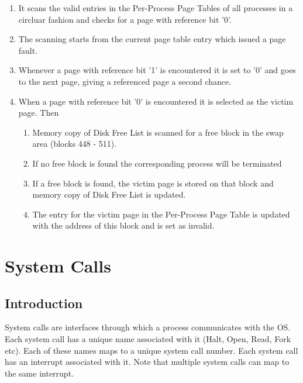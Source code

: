 \documentclass[10pt]{report}
\begin{document}
\begin{enumerate}
\item It scans the valid entries in the  Per-Process Page Tables of all processes in a circluar fashion and checks for a page with reference bit '0'.
\item The scanning starts from the current page table entry which issued a page fault.
\item Whenever a page with reference bit '1' is encountered it is set to '0' and goes to the next page, giving a referenced page a second chance.
\item When a page with reference bit '0' is encountered it is selected as the victim page. Then
	\begin{enumerate}
		\item Memory copy of Disk Free List is scanned for a free block in the swap area (blocks 448 - 511).
		\item If no free block is found the corresponding process will be terminated		
		\item If a free block is found, the victim page is stored on that block and memory copy of Disk Free List is updated.
		\item The entry for the victim page in the Per-Process Page Table is updated with the address of this block and is set as invalid.   
		
	\end{enumerate}	   

\end{enumerate}






\chapter{System Calls}
\label{chp:halt_system_calls}

\section{Introduction}
System calls are interfaces through which a process communicates with the OS. Each system call has a unique name associated with it (Halt, Open, Read, Fork etc). Each of these names maps to a unique system call number. Each system call has an interrupt associated with it. Note that multiple system calls can map to the same interrupt.
\end{document}
